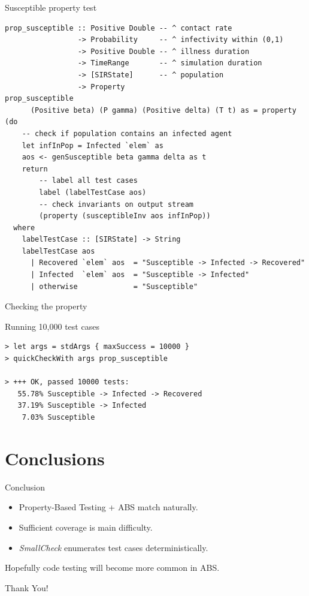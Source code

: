 \documentclass{beamer} %
\begin{document}
\begin{frame}[fragile]{Susceptible property test}
\begin{verbatim}
prop_susceptible :: Positive Double -- ^ contact rate
                 -> Probability     -- ^ infectivity within (0,1)
                 -> Positive Double -- ^ illness duration
                 -> TimeRange       -- ^ simulation duration
                 -> [SIRState]      -- ^ population
                 -> Property
prop_susceptible
      (Positive beta) (P gamma) (Positive delta) (T t) as = property (do  
    -- check if population contains an infected agent
    let infInPop = Infected `elem` as
    aos <- genSusceptible beta gamma delta as t
    return 
        -- label all test cases
        label (labelTestCase aos) 
        -- check invariants on output stream
        (property (susceptibleInv aos infInPop))
  where
    labelTestCase :: [SIRState] -> String
    labelTestCase aos
      | Recovered `elem` aos  = "Susceptible -> Infected -> Recovered"
      | Infected  `elem` aos  = "Susceptible -> Infected"
      | otherwise             = "Susceptible"
\end{verbatim}
\end{frame}

\begin{frame}[fragile]{Checking the property}
\begin{block}{Running 10,000 test cases}
\begin{footnotesize}
\begin{verbatim}
> let args = stdArgs { maxSuccess = 10000 }
> quickCheckWith args prop_susceptible

> +++ OK, passed 10000 tests:
   55.78% Susceptible -> Infected -> Recovered
   37.19% Susceptible -> Infected
    7.03% Susceptible
\end{verbatim}
\end{footnotesize}
\end{block}
\end{frame}

\section{Conclusions}
\begin{frame}{Conclusion}
	\begin{itemize}
		\item Property-Based Testing + ABS match naturally.
		\item Sufficient coverage is main difficulty.
		\item \textit{SmallCheck} enumerates test cases deterministically.
	\end{itemize}
	
\begin{block}{}
Hopefully code testing will become more common in ABS.
\end{block}
\end{frame}

\begin{frame}{}
  \begin{center}
  Thank You!
  \end{center}
\end{frame}



\end{document}
